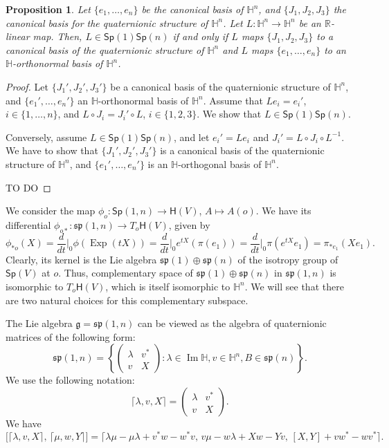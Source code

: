 \documentclass[12pt, a4paper]{amsart}
\newcommand{\Exp}{\operatorname{Exp}}
\newcommand{\g}{\mathfrak}
\newcommand{\R}{\mathbb{R}}
\renewcommand{\H}{\mathbb{H}}
\renewcommand{\Im}{\operatorname{Im}}
\newcommand{\Sp}{\mathsf{Sp}}
\newtheorem{proposition}[theorem]{Proposition}
\theoremstyle{remark}
\begin{document}
\begin{proposition}
Let $\{e_1,\dots,e_n\}$ be the canonical basis of $\H^n$, and $\{J_1,J_2,J_3\}$ the canonical basis for the quaternionic structure of $\H^n$.
Let $L\colon\H^n\to\H^n$ be an $\R$-linear map.
Then, $L\in\Sp(1)\Sp(n)$ if and only if $L$ maps $\{J_1,J_2,J_3\}$ to a canonical basis of the quaternionic structure of $\H^n$ and $L$ maps $\{e_1,\dots,e_n\}$ to an $\H$-orthonormal basis of $\H^n$.
\end{proposition}

\begin{proof}
Let $\{J_1',J_2',J_3'\}$ be a canonical basis of the quaternionic structure of $\H^n$, and $\{e_1',\dots,e_n'\}$ an $\H$-orthonormal basis of $\H^n$.
Assume that $Le_i=e_i'$, $i\in\{1,\dots,n\}$, and $L\circ J_i=J_i'\circ L$, $i\in\{1,2,3\}$.
We show that $L\in\Sp(1)\Sp(n)$.

Conversely, assume $L\in\Sp(1)\Sp(n)$, and let $e_i'=Le_i$ and $J_i'=L\circ J_i\circ L^{-1}$.
We have to show that $\{J_1',J_2',J_3'\}$ is a canonical basis of the quaternionic structure of $\H^n$, and $\{e_1',\dots,e_n'\}$ is an $\H$-orthogonal basis of $\H^n$.

TO DO
\end{proof}

We consider the map $\phi_o\colon \Sp(1,n)\to\mathsf{H}(V)$, $A\mapsto A(o)$.
We have its differential $\phi_{o*}\colon\g{sp}(1,n)\to T_o\mathsf{H}(V)$, given by
\[
\phi_{*o}(X)
=\frac{d}{dt}\Big\vert_{0}\phi(\Exp(tX))
=\frac{d}{dt}\Big\vert_{0}e^{tX}(\pi(e_1))
=\frac{d}{dt}\Big\vert_{0}\pi(e^{tX}e_1)
=\pi_{*e_1}(Xe_1).
\]
Clearly, its kernel is the Lie algebra $\g{sp}(1)\oplus\g{sp}(n)$ of the isotropy group of $\Sp(V)$ at $o$.
Thus, complementary space of $\g{sp}(1)\oplus\g{sp}(n)$ in $\g{sp}(1,n)$ is isomorphic to $T_o\mathsf{H}(V)$, which is itself isomorphic to $\H^n$.
We will see that there are two natural choices for this complementary subspace.

The Lie algebra $\g{g}=\g{sp}(1,n)$ can be viewed as the algebra of quaternionic matrices of the following form:
\[
\g{sp}(1,n)=\left\{
\left(
\begin{array}{c|c}
\lambda & v^{*} \\
\hline
v & X
\end{array}
\right):
\lambda \in \Im \H,v\in \H^{n}, B\in \g{sp}(n)
\right\}.
\]
We use the following notation: 
\[
\lceil \lambda, v, X\rceil =\left(
\begin{array}{c|c}
\lambda & v^{*} \\
\hline
v & X
\end{array}
\right).
\]
We have
\[
\bigl[\lceil \lambda,v,X \rceil,\, \lceil \mu,w,Y \rceil\bigr]
=\lceil \lambda\mu-\mu\lambda+v^{*}w-w^{*}v,\, v\mu-w\lambda+Xw-Yv,\, [X,Y]+vw^{*}-wv^{*} \rceil.
\]
\end{document}
